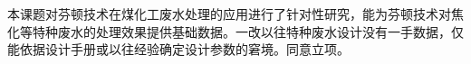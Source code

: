 本课题对芬顿技术在煤化工废水处理的应用进行了针对性研究，能为芬顿技术对焦化等特种废水的处理效果提供基础数据。一改以往特种废水设计没有一手数据，仅能依据设计手册或以往经验确定设计参数的窘境。同意立项。\par